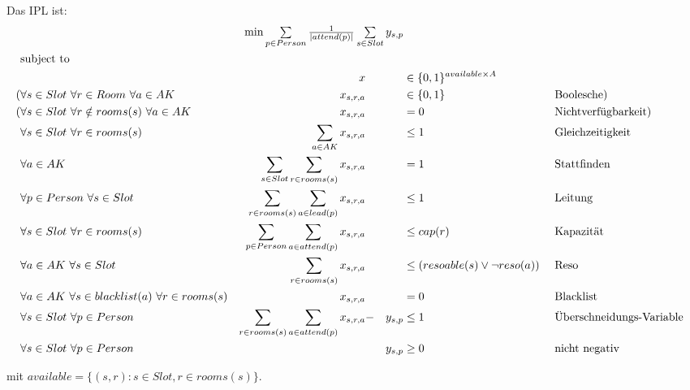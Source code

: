 \documentclass[A4]{article}
\begin{document}
Das IPL ist:
\begin{alignat*}{4}
	&&&&\llap{$\min \sum\limits_{p\in Person} \frac{1}{|attend(p)|} \sum\limits_{s\in Slot} y_{s,p}$} \\
	&\text{subject to} \\
	&& x &&& \in \{0,1\}^{ available   \times A}  && \\
	(&\forall s\in Slot\ \forall r \in Room\ \forall a \in AK  & x_{s,r,a} &&& \in \{0,1\}  && \text{Boolesche}) \\
	(&\forall s\in Slot\ \forall r \notin rooms(s)\ \forall a \in AK  & x_{s,r,a} &&&= 0 && \text{Nichtverfügbarkeit}) \\
	&\forall s\in Slot\ \forall r \in rooms(s) & \sum_{a \in AK} x_{s,r,a} &&&\leq 1 && \text{Gleichzeitigkeit} \\
	&\forall a \in AK & \sum_{s\in Slot} \sum_{r \in rooms(s)} x_{s,r,a} &&&= 1 && \text{Stattfinden} \\
	&\forall p\in Person\ \forall s \in Slot & \sum_{r \in rooms(s)} \sum_{a \in lead(p)} x_{s,r,a} &&&\leq 1 && \text{Leitung} \\
	&\forall s\in Slot\ \forall r \in rooms(s) & \sum_{p \in Person} \sum_{a \in attend(p)} x_{s,r,a} &&&\leq cap(r) && \text{Kapazität} \\
	&\forall a \in AK\  \forall s\in Slot & \sum_{r \in rooms(s)} x_{s,r,a} &&&\leq (resoable(s) \vee\neg reso(a)  ) \ && \text{Reso} \\
	&\forall a \in AK\  \forall s\in blacklist(a)\ \forall r \in rooms(s) & x_{s,r,a} &&&=0  && \text{Blacklist} \\
	&\forall s \in Slot\ \forall p\in Person  & \sum_{r \in rooms(s)} \sum_{a \in attend(p)} x_{s,r,a} & - & y_{s,p} &\leq 1 && \text{Überschneidungs-Variable} \\
	&\forall s \in Slot\ \forall p\in Person  &&&  y_{s,p} &\geq 0 && \text{nicht negativ}
\end{alignat*}

mit $available=\{ (s,r) : s \in Slot, r \in rooms(s) \}$.

\restoregeometry 
\end{document}
